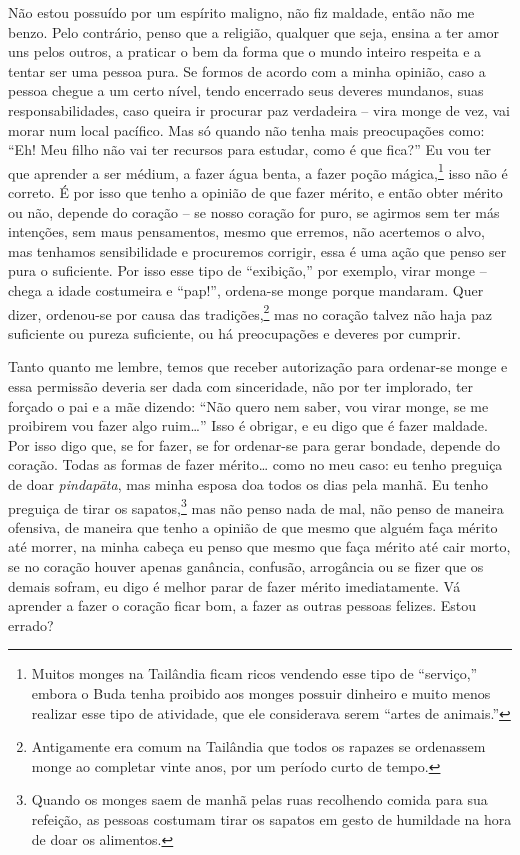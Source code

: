 Não estou possuído por um espírito maligno, não fiz maldade, então
não me benzo. Pelo contrário, penso que a religião, qualquer que seja,
ensina a ter amor uns pelos outros, a praticar o bem da forma que o
mundo inteiro respeita e a tentar ser uma pessoa pura. Se formos de
acordo com a minha opinião, caso a pessoa chegue a um certo nível,
tendo encerrado seus deveres mundanos, suas responsabilidades, caso
queira ir procurar paz verdadeira – vira monge de vez, vai morar num
local pacífico. Mas só quando não tenha mais preocupações como: “Eh!
Meu filho não vai ter recursos para estudar, como é que fica?” Eu vou
ter que aprender a ser médium, a fazer água benta, a fazer poção
mágica,\footnote{Muitos monges na Tailândia ficam ricos vendendo esse
tipo de “serviço,” embora o Buda tenha proibido aos monges possuir
dinheiro e muito menos realizar esse tipo de atividade, que ele
considerava serem “artes de animais.”} isso não é correto. É por isso
que tenho a opinião de que fazer mérito, e então obter mérito ou não,
depende do coração – se nosso coração for puro, se agirmos sem ter más
intenções, sem maus pensamentos, mesmo que erremos, não acertemos o
alvo, mas tenhamos sensibilidade e procuremos corrigir, essa é uma ação
que penso ser pura o suficiente. Por isso esse tipo de “exibição,” por
exemplo, virar monge – chega a idade costumeira e “pap!”, ordena-se
monge porque mandaram. Quer dizer, ordenou-se por causa das
tradições,\footnote{Antigamente era comum na Tailândia que todos os
rapazes se ordenassem monge ao completar vinte anos, por um período
curto de tempo.} mas no coração talvez não haja paz suficiente ou
pureza suficiente, ou há preocupações e deveres por cumprir. 

Tanto quanto me lembre, temos que receber autorização para
ordenar-se monge e essa permissão deveria ser dada com sinceridade, não
por ter implorado, ter forçado o pai e a mãe dizendo: “Não quero nem
saber, vou virar monge, se me proibirem vou fazer algo ruim…” Isso é
obrigar, e eu digo que é fazer maldade. Por isso digo que, se for
fazer, se for ordenar-se para gerar bondade, depende do coração. Todas
as formas de fazer mérito… como no meu caso: eu tenho preguiça de doar
\textit{pindapāta}, mas minha esposa doa todos os dias pela manhã. Eu
tenho preguiça de tirar os sapatos,\footnote{Quando os monges saem de
manhã pelas ruas recolhendo comida para sua refeição, as pessoas
costumam tirar os sapatos em gesto de humildade na hora de doar os
alimentos.} mas não penso nada de mal, não penso de maneira ofensiva,
de maneira que tenho a opinião de que mesmo que alguém faça mérito até
morrer, na minha cabeça eu penso que mesmo que faça mérito até cair
morto, se no coração houver apenas ganância, confusão, arrogância ou se
fizer que os demais sofram, eu digo é melhor parar de fazer mérito
imediatamente. Vá aprender a fazer o coração ficar bom, a fazer as
outras pessoas felizes. Estou errado?

